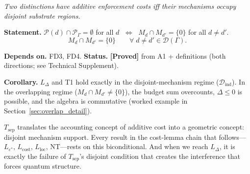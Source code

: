 \documentclass[11pt]{article}
\theoremstyle{remark}
\begin{document}
\begin{tcolorbox}[apfbox, title={Theorem $T_{\mathrm{sep}}$ (Separation Biconditional)}]
\textit{Two distinctions have additive enforcement costs iff their mechanisms occupy disjoint substrate regions.}

\smallskip\noindent\textbf{Statement.}  $\mathcal{P}(d) \cap \mathcal{P}_\Gamma = \emptyset$ for all $d$ $\;\Longleftrightarrow\;$ $M_d \cap M_{d'} = \{0\}$ for all $d \ne d'$.
\begin{equation}
M_d \cap M_{d'} = \{0\} \qquad \forall\; d \neq d' \in \mathcal{D}(\Gamma).
\label{eq:disjoint_support}
\end{equation}

\smallskip\noindent\textbf{Depends on.}  FD3, FD4.  \textbf{Status.}  \textbf{[Proved]} from A1 + definitions (both directions; see Technical Supplement).

\smallskip\noindent\textbf{Corollary.}  $L_\Delta$ and T1 hold exactly in the disjoint-mechanism regime ($\mathcal{D}_{\mathrm{ind}}$).  In the overlapping regime ($M_d \cap M_{d'} \ne \{0\}$), the budget sum overcounts, $\Delta \le 0$ is possible, and the algebra is commutative (worked example in Section~\ref{sec:overlap_detail}).
\end{tcolorbox}

\smallskip\noindent $T_{\mathrm{sep}}$ translates the accounting concept of additive cost into a geometric concept: disjoint mechanism support.  Every result in the cost-lemma chain that follows---$L_{\varepsilon^*}$, $L_{\mathrm{cost}}$, $L_{\mathrm{loc}}$, NT---rests on this biconditional.  And when we reach $L_\Delta$, it is exactly the failure of $T_{\mathrm{sep}}$'s disjoint condition that creates the interference that forces quantum structure.
\end{document}
